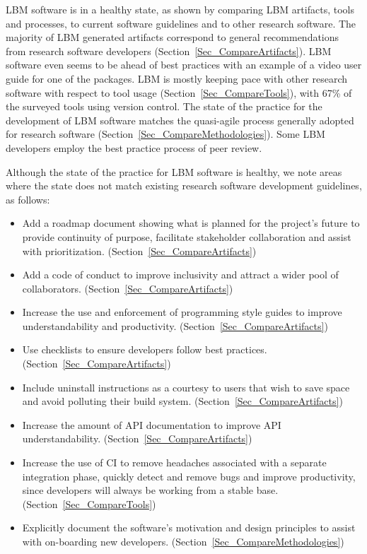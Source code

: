 \documentclass[final, 3p, times, authoryear]{elsarticle}
\begin{document}
LBM software is in a healthy state, as shown by comparing LBM artifacts, tools
and processes, to current software guidelines and to other research software.
The majority of LBM generated artifacts correspond to general recommendations
from research software developers (Section~\ref{Sec_CompareArtifacts}).  LBM
software even seems to be ahead of best practices with an example of a video
user guide for one of the packages. LBM is mostly keeping pace with other
research software with respect to tool usage (Section~\ref{Sec_CompareTools}),
with 67\% of the surveyed tools using version control.  The state of the
practice for the development of LBM software matches the quasi-agile process
generally adopted for research software
(Section~\ref{Sec_CompareMethodologies}).  Some LBM developers employ the best
practice process of peer review.

Although the state of the practice for LBM software is healthy, we note areas
where the state does not match existing research software development
guidelines, as follows:

\begin{itemize}
	\item Add a roadmap document showing what is planned for the project's future
	to provide continuity of purpose, facilitate stakeholder collaboration and
	assist with prioritization. (Section~\ref{Sec_CompareArtifacts})
	\item Add a code of conduct to improve inclusivity and attract a wider pool
	of collaborators. (Section~\ref{Sec_CompareArtifacts})
	\item Increase the use and enforcement of programming style guides to
	improve understandability and productivity.
	(Section~\ref{Sec_CompareArtifacts})
	\item Use checklists to ensure developers follow best practices.
	(Section~\ref{Sec_CompareArtifacts})
	\item Include uninstall instructions as a courtesy to users that wish to
	save space and avoid polluting their build system.
	(Section~\ref{Sec_CompareArtifacts})
	\item Increase the amount of API documentation to improve API
	understandability. (Section~\ref{Sec_CompareArtifacts})
	\item Increase the use of CI to remove headaches associated with a separate
	integration phase, quickly detect and remove bugs and improve productivity,
	since developers will always be working from a stable base.
	(Section~\ref{Sec_CompareTools})
	\item Explicitly document the software's motivation and design principles to
	assist with on-boarding new developers.
	(Section~\ref{Sec_CompareMethodologies})
\end{itemize}
\end{document}
